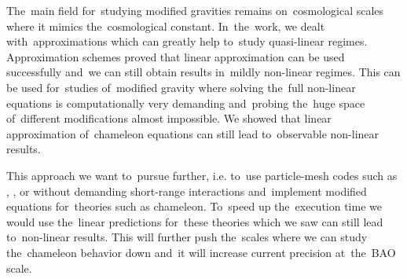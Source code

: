 The~main field for~studying modified gravities remains on~cosmological scales where it mimics the~cosmological constant. In~the~work, we dealt with~approximations which can greatly help to~study quasi-linear regimes. Approximation schemes proved that linear approximation can be used successfully and~we can still obtain results in~mildly non-linear regimes. This can be used for~studies of~modified gravity where solving the~full non-linear equations is computationally very demanding and~probing the~huge space of~different modifications almost impossible. We showed that linear approximation of~chameleon equations can still lead to~observable non-linear results.

This approach we want to~pursue further, i.e. to~use particle-mesh codes such as , , or  without demanding short-range interactions and~implement modified equations for~theories such as chameleon. To~speed up the~execution time we would use the~linear predictions for~these theories which we saw can still lead to~non-linear results. This will further push the~scales where we can study the~chameleon behavior down and~it will increase current precision at~the~BAO scale.

